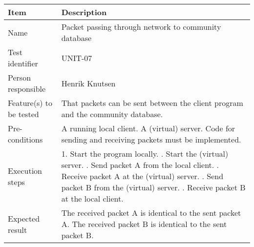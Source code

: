 		\begin{center}
			\begin{tabular}{ |  p{3.5cm} | p{10cm} | }
				\hline
				Item & Description \\ [5pt] \hline \hline
				Name & Packet passing through network to community database \\  [5pt] \hline
				Test identifier & UNIT-07 \\  [5pt] \hline
				Person responsible & Henrik Knutsen \\  [5pt] \hline
				Feature(s) to be tested & That packets can be sent between the client program and the community database.  \\  [5pt] \hline
				Pre-conditions & A running local client. A (virtual) server. Code for sending and receiving packets must be implemented. \\  [5pt] \hline
				Execution steps & 1. Start the program locally. \newline 2. Start the (virtual) server. \newline 3. Send packet A from the local client. \newline 4. Receive packet A at the (virtual) server. \newline 5. Send packet B from the (virtual) server.
					\newline 6. Receive packet B at the local client. \\  [5pt] \hline
				Expected result & The received packet A is identical to the sent packet A. The received packet B is identical to the sent packet B. \\  [5pt] \hline
			\end{tabular}
		\end{center}
